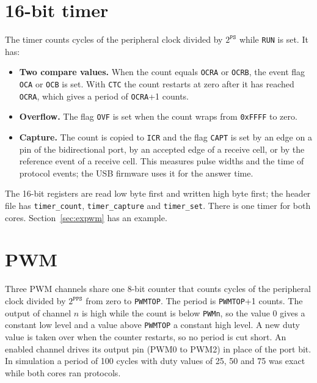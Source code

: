 \documentclass[10pt,a4paper]{article}
\newcommand{\reg}[1]{\texttt{#1}}
\begin{document}
\section{16-bit timer}\label{sec:timer}

The timer counts cycles of the peripheral clock divided by $2^{\mathtt{PS}}$ while \reg{RUN} is set. It has:

\begin{itemize}
\item \textbf{Two compare values.} When the count equals \reg{OCRA} or \reg{OCRB}, the event flag \reg{OCA} or \reg{OCB}
is set. With \reg{CTC} the count restarts at zero after it has reached \reg{OCRA}, which gives a period of
\reg{OCRA}+1 counts.
\item \textbf{Overflow.} The flag \reg{OVF} is set when the count wraps from \texttt{0xFFFF} to zero.
\item \textbf{Capture.} The count is copied to \reg{ICR} and the flag \reg{CAPT} is set by an edge on a pin of the
bidirectional port, by an accepted edge of a receive cell, or by the reference event of a receive cell. This
measures pulse widths and the time of protocol events; the USB firmware uses it for the answer time.
\end{itemize}

The 16-bit registers are read low byte first and written high byte first; the header file has
\texttt{timer\_count}, \texttt{timer\_capture} and \texttt{timer\_set}. There is one timer for both cores.
Section~\ref{sec:expwm} has an example.



\section{PWM}\label{sec:pwm}

Three PWM channels share one 8-bit counter that counts cycles of the peripheral clock divided by
$2^{\mathtt{PPS}}$ from zero to \reg{PWMTOP}. The period is \reg{PWMTOP}+1 counts. The output of channel $n$ is high
while the count is below \reg{PWMn}, so the value 0 gives a constant low level and a value above \reg{PWMTOP} a
constant high level. A new duty value is taken over when the counter restarts, so no period is cut short. An
enabled channel drives its output pin (PWM0 to PWM2) in place of the port bit. In simulation a period of 100
cycles with duty values of 25, 50 and 75 was exact while both cores ran protocols.


\end{document}
